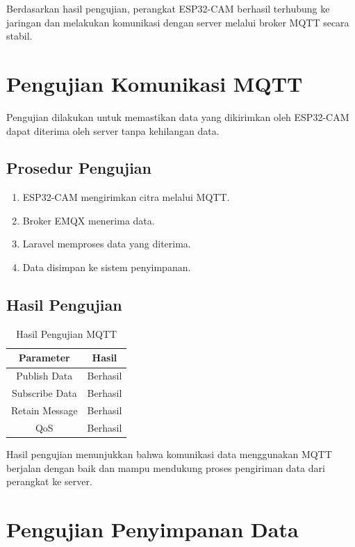 Berdasarkan hasil pengujian, perangkat ESP32-CAM berhasil terhubung ke jaringan dan melakukan komunikasi dengan server melalui broker MQTT secara stabil.

\section{Pengujian Komunikasi MQTT}

Pengujian dilakukan untuk memastikan data yang dikirimkan oleh ESP32-CAM dapat diterima oleh server tanpa kehilangan data.

\subsection{Prosedur Pengujian}

\begin{enumerate}
	\item ESP32-CAM mengirimkan citra melalui MQTT.
	\item Broker EMQX menerima data.
	\item Laravel memproses data yang diterima.
	\item Data disimpan ke sistem penyimpanan.
\end{enumerate}

\subsection{Hasil Pengujian}

\begin{table}[H]
	\centering
	\caption{Hasil Pengujian MQTT}
	\begin{tabular}{|c|c|}
		\hline
		Parameter & Hasil \\
		\hline
		Publish Data & Berhasil \\
		Subscribe Data & Berhasil \\
		Retain Message & Berhasil \\
		QoS & Berhasil \\
		\hline
	\end{tabular}
\end{table}

Hasil pengujian menunjukkan bahwa komunikasi data menggunakan MQTT berjalan dengan baik dan mampu mendukung proses pengiriman data dari perangkat ke server.

\section{Pengujian Penyimpanan Data}

